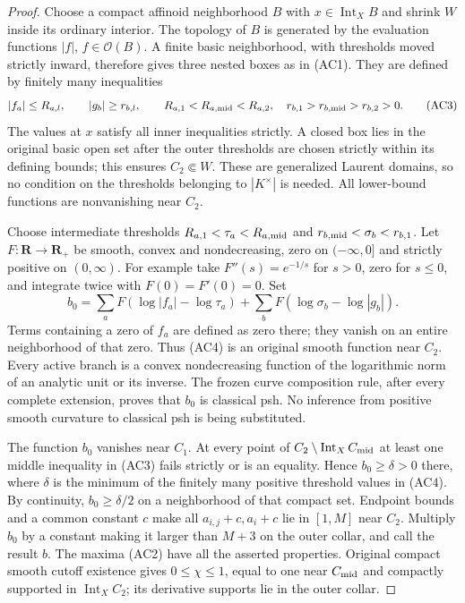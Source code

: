 \documentclass[11pt,a4paper]{article}
\numberwithin{equation}{section}
\theoremstyle{definition}
\theoremstyle{remark}
\begin{document}
\begin{proof}
Choose a compact affinoid neighborhood $B$ with $x\in\operatorname{Int}_X B$
and shrink $W$ inside its ordinary interior.  The topology of $B$ is
generated by the evaluation functions $|f|$, $f\in\mathcal O(B)$.
A finite basic neighborhood, with thresholds moved strictly inward,
therefore gives three nested boxes as in (AC1).  They are defined by
finitely many inequalities
\[
 |f_a|\le R_{a,l},\qquad |g_b|\ge r_{b,l},\qquad
 R_{a,1}<R_{a,{\rm mid}}<R_{a,2},\quad
 r_{b,1}>r_{b,{\rm mid}}>r_{b,2}>0.
 \tag{AC3}
\]
The values at $x$ satisfy all inner inequalities strictly.  A closed
box lies in the original basic open set after the outer thresholds
are chosen strictly within its defining bounds; this ensures
$C_2\Subset W$.  These are generalized Laurent domains, so no
condition on the thresholds belonging to $|K^\times|$ is needed.
All lower-bound functions are nonvanishing near $C_2$.

Choose intermediate thresholds
$R_{a,1}<\tau_a<R_{a,{\rm mid}}$ and
$r_{b,{\rm mid}}<\sigma_b<r_{b,1}$.
Let $F:\mathbf R\to\mathbf R_+$ be smooth, convex and nondecreasing,
zero on $(-\infty,0]$ and strictly positive on $(0,\infty)$.
For example take $F''(s)=e^{-1/s}$ for $s>0$, zero for $s\le0$,
and integrate twice with $F(0)=F'(0)=0$.
Set
\[
 b_0=\sum_a F(\log|f_a|-\log\tau_a)
          +\sum_b F(\log\sigma_b-\log|g_b|).
 \tag{AC4}
\]
Terms containing a zero of $f_a$ are defined as zero there; they
vanish on an entire neighborhood of that zero.  Thus (AC4) is an
original smooth function near $C_2$.  Every active branch is a
convex nondecreasing function of the logarithmic norm of an analytic
unit or its inverse.  The frozen curve composition rule, after every
complete extension, proves that $b_0$ is classical psh.  No inference
from positive smooth curvature to classical psh is being substituted.

The function $b_0$ vanishes near $C_1$.  At every point of
$C_2\setminus\operatorname{Int}_X C_{\rm mid}$ at least one middle
inequality in (AC3) fails strictly or is an equality.  Hence
$b_0\ge\delta>0$ there, where $\delta$ is the minimum of the
finitely many positive threshold values in (AC4).  By continuity,
$b_0\ge\delta/2$ on a neighborhood of that compact set.
Endpoint bounds and a common constant $c$ make all $a_{i,j}+c,a_i+c$
lie in $[1,M]$ near $C_2$.  Multiply $b_0$ by a constant making it
larger than $M+3$ on the outer collar, and call the result $b$.
The maxima (AC2) have all the asserted properties.  Original compact
smooth cutoff existence gives $0\le\chi\le1$, equal to one near
$C_{\rm mid}$ and compactly supported in $\operatorname{Int}_X C_2$;
its derivative supports lie in the outer collar.
\end{proof}
\end{document}
